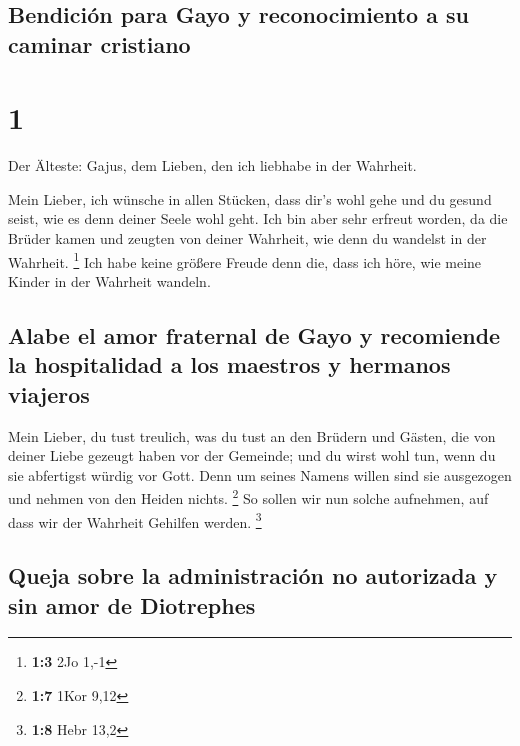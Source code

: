 \hypertarget{bendiciuxf3n-para-gayo-y-reconocimiento-a-su-caminar-cristiano}{%
\subsection{Bendición para Gayo y reconocimiento a su caminar
cristiano}\label{bendiciuxf3n-para-gayo-y-reconocimiento-a-su-caminar-cristiano}}

\hypertarget{section}{%
\section{1}\label{section}}

 Der Älteste: Gajus, dem Lieben, den ich liebhabe in der
Wahrheit.

 Mein Lieber, ich wünsche in allen Stücken, dass dir's
wohl gehe und du gesund seist, wie es denn deiner Seele wohl geht.
 Ich bin aber sehr erfreut worden, da die Brüder kamen und
zeugten von deiner Wahrheit, wie denn du wandelst in der Wahrheit.
\footnote{\textbf{1:3} 2Jo 1,-1}  Ich habe keine größere
Freude denn die, dass ich höre, wie meine Kinder in der Wahrheit
wandeln.

\hypertarget{alabe-el-amor-fraternal-de-gayo-y-recomiende-la-hospitalidad-a-los-maestros-y-hermanos-viajeros}{%
\subsection{Alabe el amor fraternal de Gayo y recomiende la hospitalidad
a los maestros y hermanos
viajeros}\label{alabe-el-amor-fraternal-de-gayo-y-recomiende-la-hospitalidad-a-los-maestros-y-hermanos-viajeros}}

 Mein Lieber, du tust treulich, was du tust an den Brüdern
und Gästen,  die von deiner Liebe gezeugt haben vor der
Gemeinde; und du wirst wohl tun, wenn du sie abfertigst würdig vor Gott.
 Denn um seines Namens willen sind sie ausgezogen und
nehmen von den Heiden nichts. \footnote{\textbf{1:7} 1Kor 9,12}
 So sollen wir nun solche aufnehmen, auf dass wir der
Wahrheit Gehilfen werden. \footnote{\textbf{1:8} Hebr 13,2}

\hypertarget{queja-sobre-la-administraciuxf3n-no-autorizada-y-sin-amor-de-diotrephes}{%
\subsection{Queja sobre la administración no autorizada y sin amor de
Diotrephes}\label{queja-sobre-la-administraciuxf3n-no-autorizada-y-sin-amor-de-diotrephes}}

